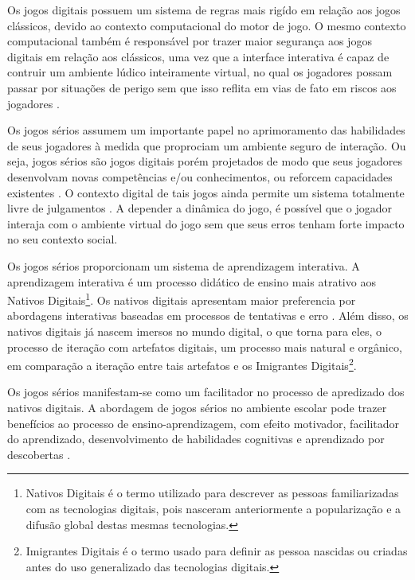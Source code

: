 \vspace{-0,1cm}

Os jogos digitais possuem um sistema de regras mais rigído em relação aos jogos clássicos, devido ao contexto computacional do motor de jogo. O mesmo contexto computacional também é responsável por trazer maior segurança aos jogos digitais em relação aos clássicos, uma vez que a interface interativa é capaz de contruir um ambiente lúdico inteiramente virtual, no qual os jogadores possam passar por situações de perigo sem que isso reflita em vias de fato em riscos aos jogadores \cite{lucchese2009conceituaccao}.



Os jogos sérios assumem um importante papel no aprimoramento das habilidades de seus jogadores à medida que proprociam um ambiente seguro de interação. Ou seja, jogos sérios são jogos digitais porém projetados de modo que seus jogadores desenvolvam novas competências e/ou conhecimentos, ou reforcem capacidades existentes \cite{boller2017play}. O contexto digital de tais jogos ainda permite um sistema totalmente livre de julgamentos \cite{women2018international}. A depender a dinâmica do jogo, é possível que o jogador interaja com o ambiente virtual do jogo sem que seus erros tenham forte impacto no seu contexto social.

Os jogos sérios proporcionam um sistema de aprendizagem interativa. A aprendizagem interativa é um processo didático de ensino mais atrativo aos Nativos Digitais\footnote{Nativos Digitais é o termo utilizado para descrever as pessoas familiarizadas com as tecnologias digitais, pois nasceram anteriormente a popularização e a difusão global destas mesmas tecnologias.}. Os nativos digitais apresentam maior preferencia por abordagens interativas baseadas em processos de tentativas e erro \cite{pescador2010tecnologias}. Além disso, os nativos digitais já nascem imersos no mundo digital, o que torna para eles, o processo de iteração com artefatos digitais, um processo mais natural e orgânico, em comparação a iteração entre tais artefatos e os Imigrantes Digitais\footnote{Imigrantes Digitais é o termo usado para definir as pessoa nascidas ou criadas antes do uso generalizado das tecnologias digitais.}.



Os jogos sérios manifestam-se como um facilitador no processo de apredizado dos nativos digitais. A abordagem de jogos sérios no ambiente escolar pode trazer benefícios ao processo de ensino-aprendizagem, com efeito motivador, facilitador do aprendizado, desenvolvimento de habilidades cognitivas e aprendizado por descobertas \cite{de2017move4math}.

